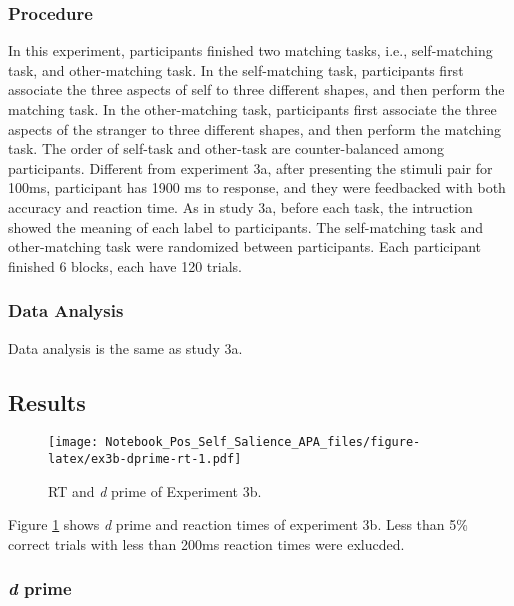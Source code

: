 \documentclass[man]{apa6}
\begin{document}
\hypertarget{procedure-5}{%
\subsubsection{Procedure}\label{procedure-5}}

In this experiment, participants finished two matching tasks, i.e., self-matching task, and other-matching task. In the self-matching task, participants first associate the three aspects of self to three different shapes, and then perform the matching task. In the other-matching task, participants first associate the three aspects of the stranger to three different shapes, and then perform the matching task. The order of self-task and other-task are counter-balanced among participants.
Different from experiment 3a, after presenting the stimuli pair for 100ms, participant has 1900 ms to response, and they were feedbacked with both accuracy and reaction time.
As in study 3a, before each task, the intruction showed the meaning of each label to participants. The self-matching task and other-matching task were randomized between participants. Each participant finished 6 blocks, each have 120 trials.

\hypertarget{data-analysis-5}{%
\subsubsection{Data Analysis}\label{data-analysis-5}}

Data analysis is the same as study 3a.

\hypertarget{results-5}{%
\subsection{Results}\label{results-5}}

\begin{figure}
\centering
\texttt{[image: Notebook\_Pos\_Self\_Salience\_APA\_files/figure-latex/ex3b-dprime-rt-1.pdf]}
\caption{\label{fig:ex3b-dprime-rt}RT and \emph{d} prime of Experiment 3b.}
\end{figure}

Figure \ref{fig:ex3b-dprime-rt} shows \emph{d} prime and reaction times of experiment 3b. Less than 5\% correct trials with less than 200ms reaction times were exlucded.

\hypertarget{d-prime-3}{%
\subsubsection{\texorpdfstring{\emph{d} prime}{d prime}}\label{d-prime-3}}
\end{document}
